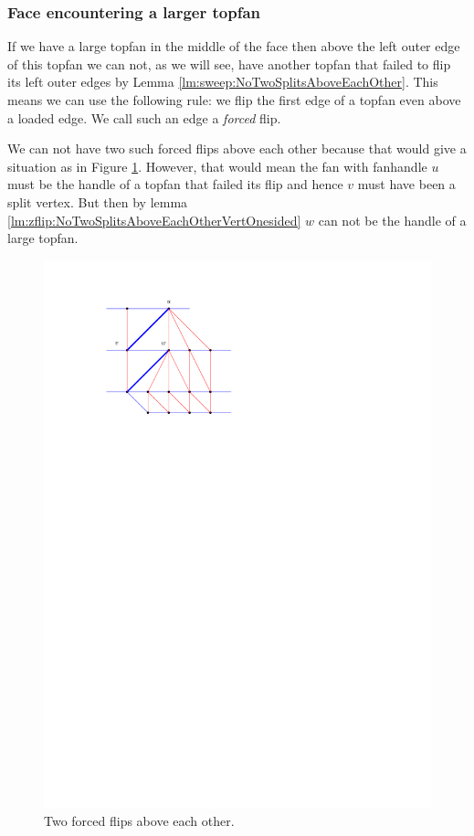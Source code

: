 \subsubsection{Face encountering a larger topfan}
  If we have a large topfan in the middle of the face then above the left outer edge of this topfan we can not, as we will see, have another topfan that failed to flip its left outer edges by Lemma \ref{lm:sweep:NoTwoSplitsAboveEachOther}.
  This means we can use the following rule: we flip the first edge of a topfan even above a loaded edge.
  We call such an edge a \emph{forced} flip.

  We can not have two such forced flips above each other because that would give a situation as in Figure \ref{fig:subdiv:forcedFlips}.
  However, that would mean the fan with fanhandle $u$ must be the handle of a topfan that failed its flip and hence $v$ must have been a split vertex. But then by lemma \ref{lm:zflip:NoTwoSplitsAboveEachOtherVertOnesided} $w$ can not be the handle of a large topfan.

  \begin{figure}[t]
    \centering
    \includegraphics[scale=1]{blueFaceSubdivision/img/forcedFlips.pdf}
    \caption{Two forced flips above each other.}
    \label{fig:subdiv:forcedFlips}
  \end{figure}

